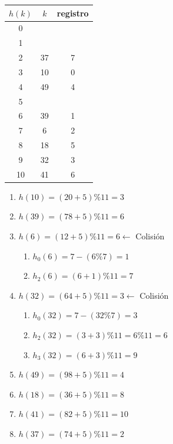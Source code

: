 \documentclass[10pt,a4paper,spanish]{report}
\begin{document}
\begin{minipage}{0.5\textwidth}
\begin{tabular}{c|c|c}
$h(k)$ & $k$ & registro \\
\hline
0 & & \\
1 & & \\
2 & 37 & 7 \\
3 & 10 & 0 \\
4 & 49  & 4 \\
5 & & \\
6 & 39 & 1 \\
7 & 6 & 2 \\
8 & 18 & 5 \\
9 & 32 & 3 \\
10 & 41 & 6 \\
\end{tabular}
\end{minipage}
\begin{minipage}{0.7\textwidth}
\begin{enumerate}[$\heartsuit$]
      \item $h(10) = (20 + 5) \% 11 = 3$
      \item $h(39) = (78 + 5) \% 11 = 6$
      \item $h(6) = (12 + 5) \% 11 = 6 \longleftarrow$ Colisión
      \begin{enumerate}[$\bigstar$]
            \item $h_0 (6) = 7 - (6 \% 7) = 1$
            \item $h_2 (6) = (6+1)\%11 = 7$
      \end{enumerate}
      \item $h(32) = (64 + 5) \% 11 = 3 \longleftarrow$ Colisión
      \begin{enumerate}[$\bigstar$]
            \item $h_0 (32) = 7 - (32 \% 7) = 3$
            \item $h_2 (32) = (3+3)\%11 = 6 \% 11 = 6$
            \item $h_3 (32) = (6+3) \%11 = 9$
      \end{enumerate}
      \item $h(49) = (98 + 5) \% 11 = 4 $ 
      \item $h(18) = (36 + 5) \% 11 = 8 $
      \item $h(41) = (82+5) \% 11 = 10$
      \item $h(37) = (74+5) \% 11 = 2$
\end{enumerate}
\end{minipage}
\end{document}
